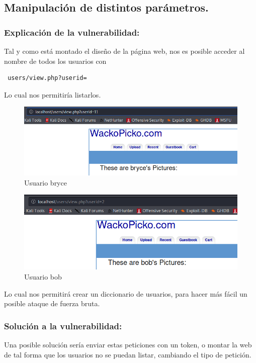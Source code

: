 \documentclass[12pt,twoside]{article}
\begin{document}
\subsection{Manipulación de distintos parámetros.}
\subsubsection*{Explicación de la vulnerabilidad:}
Tal y como está montado el diseño de la página web, nos es posible acceder al nombre de todos los usuarios con
\begin{verbatim}
 users/view.php?userid=
\end{verbatim}
Lo cual nos permitiría listarlos. 
\begin{figure}[H]
    \centering
    \includegraphics[scale=0.5]{./imagenes/manipulacion_parametros_1}
    \caption{Usuario bryce}
\end{figure}
\begin{figure}[H]
    \centering
    \includegraphics[scale=0.5]{./imagenes/manipulacion_parametros_2}
    \caption{Usuario bob}
\end{figure}
Lo cual nos permitirá crear un diccionario de usuarios, para hacer más fácil un posible ataque de fuerza bruta.
\subsubsection*{Solución a  la vulnerabilidad:}
Una posible solución sería enviar estas peticiones con un token, o montar la web de tal forma que los usuarios no se puedan listar, cambiando el tipo de petición.
\end{document}
